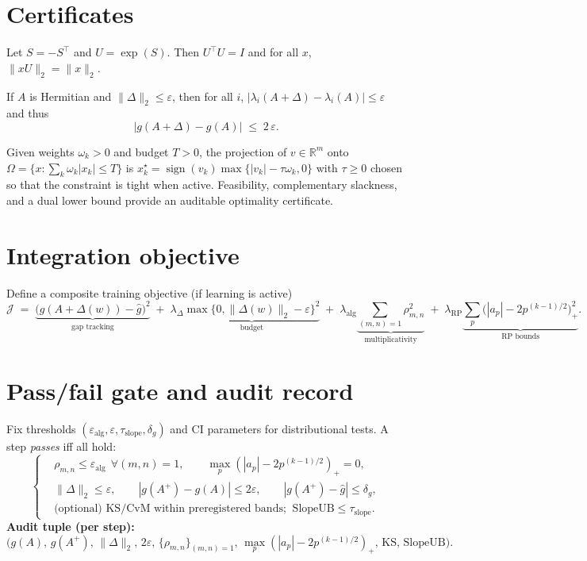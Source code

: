 \documentclass[11pt]{article}
\newcommand{\R}{\mathbb{R}}
\newcommand{\Id}{I}
\begin{document}
\section{Certificates}
\begin{prop}
Let $S=-S^\top$ and $U=\exp(S)$. Then $U^\top U=\Id$ and for all $x$, $\|xU\|_2=\|x\|_2$.
\end{prop}

\begin{prop}\label{prop:weyl-gap}
If $A$ is Hermitian and $\|\Delta\|_2\le \varepsilon$, then for all $i$, $|\lambda_i(A+\Delta)-\lambda_i(A)|\le \varepsilon$ and thus
\[
|g(A+\Delta)-g(A)|\;\le\; 2\,\varepsilon.
\]
\end{prop}

\begin{prop}
Given weights $\omega_k>0$ and budget $T>0$, the projection of $v\in\R^m$ onto 
$\Omega=\{x:\sum_k \omega_k|x_k|\le T\}$ is
$x_k^\star=\operatorname{sign}(v_k)\max\{|v_k|-\tau\omega_k,0\}$ with $\tau\ge 0$ chosen so that the constraint is tight when active. Feasibility, complementary slackness, and a dual lower bound provide an auditable optimality certificate.
\end{prop}

\section{Integration objective}
Define a composite training objective (if learning is active)
\[
\mathcal{J}\;=\; 
\underbrace{\big(g(A+\Delta(w))-\hat g\big)^2}_{\text{gap tracking}}
\;+\;\lambda_\Delta \underbrace{\max\{0,\|\Delta(w)\|_2-\varepsilon\}^2}_{\text{budget}}
\;+\;\lambda_{\mathrm{alg}}\underbrace{\sum_{(m,n)=1}\rho_{m,n}^2}_{\text{multiplicativity}}
\;+\;\lambda_{\mathrm{RP}}\underbrace{\sum_{p} \big(|a_p|-2p^{(k-1)/2}\big)_+^2}_{\text{RP bounds}}.
\]

\section{Pass/fail gate and audit record}
Fix thresholds $(\varepsilon_{\mathrm{alg}},\varepsilon,\tau_{\mathrm{slope}},\delta_g)$ and CI parameters for distributional tests. 
A step \emph{passes} iff all hold:
\[
\left\{
\begin{aligned}
&\rho_{m,n}\le \varepsilon_{\mathrm{alg}}\ \ \forall(m,n)=1, \qquad \max_p(|a_p|-2p^{(k-1)/2})_+=0,\\
&\|\Delta\|_2\le \varepsilon, \qquad |g(A^+)-g(A)|\le 2\varepsilon, \qquad |g(A^+)-\hat g|\le \delta_g,\\
&\text{(optional) KS/CvM within preregistered bands; }\ \mathrm{SlopeUB}\le \tau_{\mathrm{slope}}.
\end{aligned}
\right.
\]
\textbf{Audit tuple (per step):}
\[
\big(g(A),\, g(A^+),\, \|\Delta\|_2,\, 2\varepsilon,\,
\{\rho_{m,n}\}_{(m,n)=1},\, \max_p(|a_p|-2p^{(k-1)/2})_+,\, \mathrm{KS},\, \mathrm{SlopeUB}\big).
\]
\end{document}

